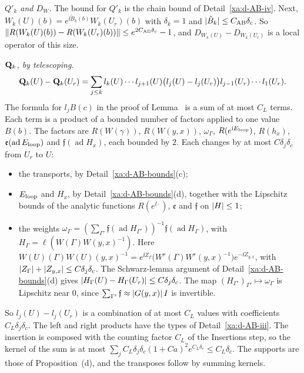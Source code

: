 \begin{detail}\label{xa:d-AB-v}
\emph{$Q'_k$ and $D_W$.} The bound for $Q'_k$ is the chain bound of Detail~\ref{xa:d-AB-iv}. Next, $W_k(U)(b)=e^{\ii\tilde B_k(b)}W_k(U_r)(b)$ with $\delta_k=1$ and $\lvert\tilde B_k\rvert\le C_{\rm AB}\delta_c$. So $\lVert R(W_k(U)(b))-R(W_k(U_r)(b))\rVert\le e^{2C_{\rm AB}\delta_c}-1$, and $D_{W_k(U)}-D_{W_k(U_r)}$ is a local operator of this size.

\emph{$\mathbf Q_k$, by telescoping.}
\[
\mathbf Q_k(U)-\mathbf Q_k(U_r)=\sum_{j\le k}l_k(U)\cdots l_{j+1}(U)\big(l_j(U)-l_j(U_r)\big)l_{j-1}(U_r)\cdots l_1(U_r).
\]
The formula for $l_jB(c)$ in the proof of Lemma~ is a sum of at most $C_L$ terms. Each term is a product of a bounded number of factors applied to one value $B(b)$. The factors are $R(W(\gamma))$, $R(W(y,x))$, $\omega_\Gamma$, $R(e^{\mathrm i E_{\rm loop}})$, $R(h_x)$, $\mathfrak e(\operatorname{ad}E_{\rm loop})$ and $\mathfrak f(\operatorname{ad}H_x)$, each bounded by $2$. Each changes by at most $C\delta_j\delta_c$ from $U_r$ to $U$:
\begin{itemize}
\item the transports, by Detail~\ref{xa:d-AB-bounds}(c);
\item $E_{\rm loop}$ and $H_x$, by Detail~\ref{xa:d-AB-bounds}(d), together with the Lipschitz bounds of the analytic functions $R(e^{\ii\cdot})$, $\mathfrak e$ and $\mathfrak f$ on $\lvert H\rvert\le1$;
\item the weights $\omega_\Gamma=(\sum_{\Gamma'}\mathfrak f(\operatorname{ad}H_{\Gamma'}))^{-1}\mathfrak f(\operatorname{ad}H_\Gamma)$, with $H_\Gamma=\ell(W(\Gamma)W(y,x)^{-1})$. Here $W(U)(\Gamma)W(U)(y,x)^{-1}=e^{\ii Z_\Gamma}\big(W^r(\Gamma)W^r(y,x)^{-1}\big)e^{-\ii Z_{y,x}}$, with $\lvert Z_\Gamma\rvert+\lvert Z_{y,x}\rvert\le C\delta_j\delta_c$. The Schwarz-lemma argument of Detail~\ref{xa:d-AB-bounds}(d) gives $\lvert H_\Gamma(U)-H_\Gamma(U_r)\rvert\le C\delta_j\delta_c$. The map $(H_{\Gamma'})_{\Gamma'}\mapsto\omega_\Gamma$ is Lipschitz near $0$, since $\sum_{\Gamma'}\mathfrak f\approx\lvert G(y,x)\rvert\,I$ is invertible.
\end{itemize}
So $l_j(U)-l_j(U_r)$ is a combination of at most $C_L$ values with coefficients $C_L\delta_j\delta_c$. The left and right products have the types of Detail~\ref{xa:d-AB-iii}. The insertion is composed with the counting factor $C_L$ of the Insertions step, so the kernel of the sum is at most $\sum_jC_L\delta_j\delta_c(1+Ca)^2e^{C_L\delta_c}\le C_L\delta_c$. The supports are those of Proposition~(d), and the transposes follow by summing kernels.
\end{detail}

